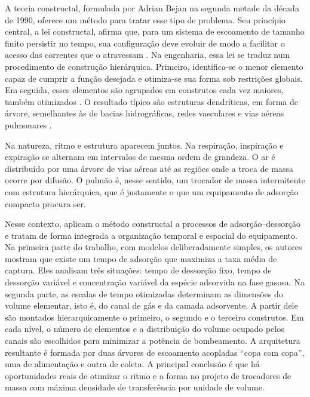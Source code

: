 A teoria constructal, formulada por Adrian Bejan na segunda metade da década de
1990, oferece um método para tratar esse tipo de problema. Seu princípio
central, a lei constructal, afirma que, para um sistema de escoamento de
tamanho finito persistir no tempo, sua configuração deve evoluir de modo a
facilitar o acesso das correntes que o atravessam
\cite{bejan2000,bejan2008}. Na engenharia, essa lei se traduz num procedimento
de construção hierárquica. Primeiro, identifica-se o menor elemento capaz de
cumprir a função desejada e otimiza-se sua forma sob restrições globais. Em
seguida, esses elementos são agrupados em construtos cada vez maiores, também
otimizados \cite{bejan1997}. O resultado típico são estruturas dendríticas, em
forma de árvore, semelhantes às de bacias hidrográficas, redes vasculares e vias
aéreas pulmonares \cite{bejan2012}.

Na natureza, ritmo e estrutura aparecem juntos. Na respiração, inspiração e
expiração se alternam em intervalos de mesma ordem de grandeza. O ar é
distribuído por uma árvore de vias aéreas até as regiões onde a troca de massa
ocorre por difusão. O pulmão é, nesse sentido, um trocador de massa
intermitente com estrutura hierárquica, que é justamente o que um equipamento
de adsorção compacto procura ser.

Nesse contexto,  aplicam o método constructal a
processos de adsorção--dessorção e tratam de forma integrada a organização
temporal e espacial do equipamento. Na primeira parte do trabalho, com modelos
deliberadamente simples, os autores mostram que existe um tempo de adsorção que
maximiza a taxa média de captura. Eles analisam três situações: tempo de
dessorção fixo, tempo de dessorção variável e concentração variável da espécie
adsorvida na fase gasosa. Na segunda parte, as escalas de tempo otimizadas
determinam as dimensões do volume elementar, isto é, do canal de gás e da camada
adsorvente. A partir dele são montados hierarquicamente o primeiro, o segundo e
o terceiro construtos. Em cada nível, o número de elementos e a distribuição do
volume ocupado pelos canais são escolhidos para minimizar a potência de
bombeamento. A arquitetura resultante é formada por duas árvores de escoamento
acopladas ``copa com copa'', uma de alimentação e outra de coleta. A principal
conclusão é que há oportunidades reais de otimizar o ritmo e a forma no projeto
de trocadores de massa com máxima densidade de transferência por unidade de
volume.


